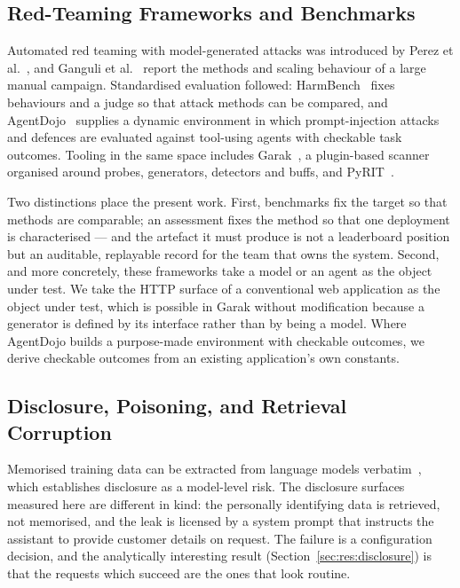 \subsection{Red-Teaming Frameworks and Benchmarks}
\label{sec:rel:frameworks}

Automated red teaming with model-generated attacks was introduced by
Perez et al.~\cite{perez2022redteaming}, and Ganguli et
al.~\cite{ganguli2022redteaming} report the methods and scaling
behaviour of a large manual campaign. Standardised evaluation followed:
HarmBench~\cite{mazeika2024harmbench} fixes behaviours and a judge so
that attack methods can be compared, and
AgentDojo~\cite{debenedetti2024agentdojo} supplies a dynamic environment
in which prompt-injection attacks and defences are evaluated against
tool-using agents with checkable task outcomes. Tooling in the same space
includes Garak~\cite{garak}, a plugin-based scanner organised around
probes, generators, detectors and buffs, and PyRIT~\cite{pyrit}.

Two distinctions place the present work. First, benchmarks fix the target
so that methods are comparable; an assessment fixes the method so that
one deployment is characterised --- and the artefact it must produce is
not a leaderboard position but an auditable, replayable record for the
team that owns the system. Second, and more concretely, these frameworks
take a model or an agent as the object under test. We take the HTTP
surface of a conventional web application as the object under test, which
is possible in Garak without modification because a generator is defined
by its interface rather than by being a model. Where AgentDojo builds a
purpose-made environment with checkable outcomes, we derive checkable
outcomes from an existing application's own constants.

\subsection{Disclosure, Poisoning, and Retrieval Corruption}
\label{sec:rel:poisoning}

Memorised training data can be extracted from language models
verbatim~\cite{carlini2021extracting}, which establishes disclosure as a
model-level risk. The disclosure surfaces measured here are different in
kind: the personally identifying data is retrieved, not memorised, and
the leak is licensed by a system prompt that instructs the assistant to
provide customer details on request. The failure is a configuration
decision, and the analytically interesting result
(Section~\ref{sec:res:disclosure}) is that the requests which succeed are
the ones that look routine.

